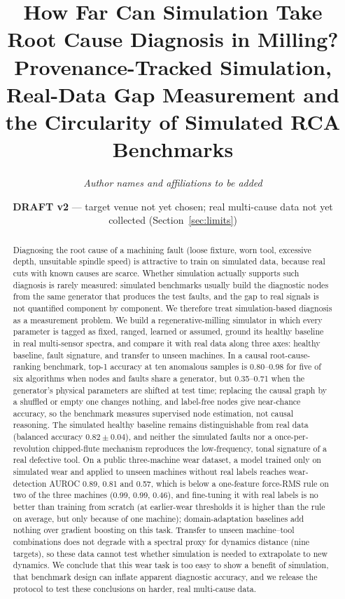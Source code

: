 \documentclass[11pt]{article}
\title{How Far Can Simulation Take Root Cause Diagnosis in Milling?\\
Provenance-Tracked Simulation, Real-Data Gap Measurement and the Circularity of Simulated RCA Benchmarks}
\author{\textit{Author names and affiliations to be added}}
\date{\textbf{DRAFT v2} --- target venue not yet chosen; real multi-cause data not yet collected (Section~\ref{sec:limits})}
\begin{document}
\maketitle

\begin{abstract}
Diagnosing the root cause of a machining fault (loose fixture, worn tool, excessive depth, unsuitable spindle speed) is attractive to train on simulated data, because real cuts with known causes are scarce.
Whether simulation actually supports such diagnosis is rarely measured: simulated benchmarks usually build the diagnostic nodes from the same generator that produces the test faults, and the gap to real signals is not quantified component by component.
We therefore treat simulation-based diagnosis as a measurement problem.
We build a regenerative-milling simulator in which every parameter is tagged as fixed, ranged, learned or assumed, ground its healthy baseline in real multi-sensor spectra, and compare it with real data along three axes: healthy baseline, fault signature, and transfer to unseen machines.
In a causal root-cause-ranking benchmark, top-1 accuracy at ten anomalous samples is 0.80--0.98 for five of six algorithms when nodes and faults share a generator, but 0.35--0.71 when the generator's physical parameters are shifted at test time; replacing the causal graph by a shuffled or empty one changes nothing, and label-free nodes give near-chance accuracy, so the benchmark measures supervised node estimation, not causal reasoning.
The simulated healthy baseline remains distinguishable from real data (balanced accuracy $0.82\pm0.04$), and neither the simulated faults nor a once-per-revolution chipped-flute mechanism reproduces the low-frequency, tonal signature of a real defective tool.
On a public three-machine wear dataset, a model trained only on simulated wear and applied to unseen machines without real labels reaches wear-detection AUROC 0.89, 0.81 and 0.57, which is below a one-feature force-RMS rule on two of the three machines (0.99, 0.99, 0.46), and fine-tuning it with real labels is no better than training from scratch (at earlier-wear thresholds it is higher than the rule on average, but only because of one machine); domain-adaptation baselines add nothing over gradient boosting on this task.
Transfer to unseen machine--tool combinations does not degrade with a spectral proxy for dynamics distance (nine targets), so these data cannot test whether simulation is needed to extrapolate to new dynamics.
We conclude that this wear task is too easy to show a benefit of simulation, that benchmark design can inflate apparent diagnostic accuracy, and we release the protocol to test these conclusions on harder, real multi-cause data.
\end{abstract}
\end{document}
